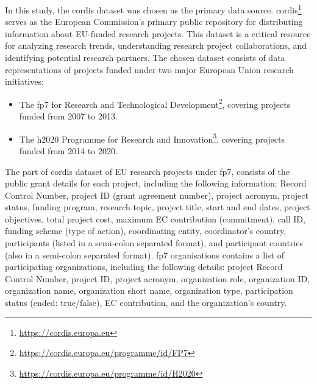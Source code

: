 In this study, the \gls{cordis} dataset \cite{CORDIS_FP7_2015,CORDIS_H2020_2015,CORDIS_RefData_2018} was chosen as the primary data source.
\gls{cordis}\footnote{\url{https://cordis.europa.eu}} serves as the European Commission's primary public repository for distributing information about EU-funded research projects.
This dataset is a critical resource for analyzing research trends, understanding research project collaborations, and identifying potential research partners.
The chosen dataset consists of data representations of projects funded under two major European Union research initiatives:
\begin{itemize}
    \item The \gls{fp7} for Research and Technological Development\footnote{\url{https://cordis.europa.eu/programme/id/FP7}}, covering projects funded from 2007 to 2013.
    \item The \gls{h2020} Programme for Research and Innovation\footnote{\url{https://cordis.europa.eu/programme/id/H2020}}, covering projects funded from 2014 to 2020.
\end{itemize}

The part of \gls{cordis} dataset of EU research projects under \gls{fp7}, consists of the public grant details for each project, including the following information: Record Control Number, project ID (grant agreement number), project acronym, project status, funding program, research topic, project title, start and end dates, project objectives, total project cost, maximum EC contribution (commitment), call ID, funding scheme (type of action), coordinating entity, coordinator's country, participants (listed in a semi-colon separated format), and participant countries (also in a semi-colon separated format).
\gls{fp7} organisations contains a list of participating organizations, including the following details: project Record Control Number, project ID, project acronym, organization role, organization ID, organization name, organization short name, organization type, participation status (ended: true/false), EC contribution, and the organization's country.

